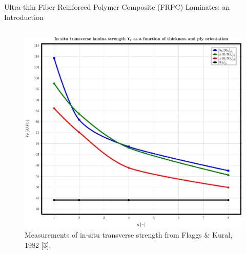 \documentclass[final]{beamer}
\begin{document}
\begin{frame}
\begin{center}
\begin{minipage}{\textwidth}
\begin{block}{\rule[-0.6ex]{0pt}{50pt}\centering\LARGE Ultra-thin Fiber Reinforced Polymer Composite (FRPC) Laminates: an Introduction}
\begin{columns}
\begin{column}{0.35\textwidth}
\begin{center}
\begin{figure}[!h]
\centering
     \includegraphics[width=0.9\columnwidth,height=0.175\textheight]{Flaggs-Kural_InSituTransverseStrength.pdf}
\caption{\small Measurements of in-situ transverse strength from Flaggs \& Kural, 1982 [3].}
\end{figure}
     \end{center}
\end{column}
\end{columns}
\end{block}
\end{minipage}
\end{center}


\end{frame}
\end{document}
